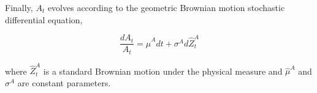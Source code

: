 Finally, $A_{t}$ evolves according to the geometric Brownian motion stochastic differential equation,

        \begin{equation}

        \frac{d A_{t}}{A_{t}} = \widehat{\mu}^{A}\!d t+{\sigma}^{A}\!d\widehat{Z}_{t}^{A}

        \end{equation}

        where $\widehat{Z}_{t}^{A}$ is a standard Brownian motion under the physical measure and $\widehat{\mu}^{A}$ and ${\sigma}^{A}$ are constant parameters.